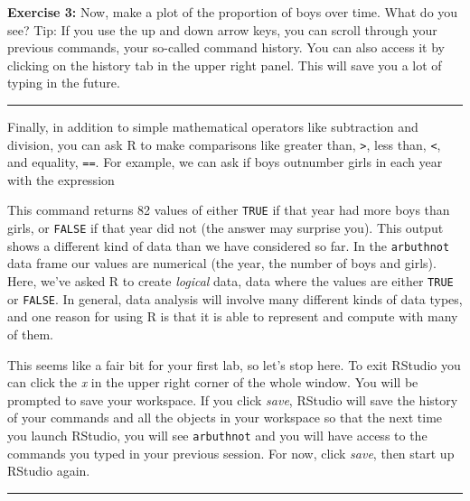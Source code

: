 \documentclass[]{book}
\newenvironment{Shaded}{\begin{snugshade}}{\end{snugshade}}
\newcommand{\StringTok}[1]{\textcolor[rgb]{0.31,0.60,0.02}{{#1}}}
\newcommand{\NormalTok}[1]{{#1}}
\theoremstyle{definition}
\theoremstyle{definition}
\theoremstyle{definition}
\theoremstyle{remark}
\begin{document}
\textbf{Exercise 3:} Now, make a plot of the proportion of boys over
time. What do you see? Tip: If you use the up and down arrow keys, you
can scroll through your previous commands, your so-called command
history. You can also access it by clicking on the history tab in the
upper right panel. This will save you a lot of typing in the future.

\begin{center}\rule{0.5\linewidth}{\linethickness}\end{center}

Finally, in addition to simple mathematical operators like subtraction
and division, you can ask R to make comparisons like greater than,
\texttt{\textgreater{}}, less than, \texttt{\textless{}}, and equality,
\texttt{==}. For example, we can ask if boys outnumber girls in each
year with the expression

\begin{Shaded}
\end{Shaded}

This command returns 82 values of either \texttt{TRUE} if that year had
more boys than girls, or \texttt{FALSE} if that year did not (the answer
may surprise you). This output shows a different kind of data than we
have considered so far. In the \texttt{arbuthnot} data frame our values
are numerical (the year, the number of boys and girls). Here, we've
asked R to create \emph{logical} data, data where the values are either
\texttt{TRUE} or \texttt{FALSE}. In general, data analysis will involve
many different kinds of data types, and one reason for using R is that
it is able to represent and compute with many of them.

This seems like a fair bit for your first lab, so let's stop here. To
exit RStudio you can click the \emph{x} in the upper right corner of the
whole window. You will be prompted to save your workspace. If you click
\emph{save}, RStudio will save the history of your commands and all the
objects in your workspace so that the next time you launch RStudio, you
will see \texttt{arbuthnot} and you will have access to the commands you
typed in your previous session. For now, click \emph{save}, then start
up RStudio again.

\begin{center}\rule{0.5\linewidth}{\linethickness}\end{center}
\end{document}
